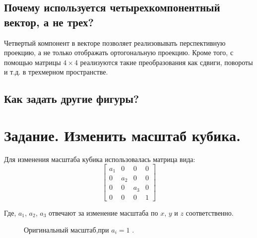\documentclass[a5paper, 10pt]{article}
\theoremstyle{definition}
\theoremstyle{plain}
\theoremstyle{remark}
\begin{document}
\newpage
\subsection{Почему используется четырехкомпонентный вектор, а не трех?}
Четвертый компонент в векторе позволяет реализовывать перспективную проекцию, а не только отображать ортогональную проекцию. Кроме того, с помощью матрицы $4 \times 4$ реализуются такие преобразования как сдвиги, повороты и т.д. в трехмерном пространстве.

\subsection{Как задать другие фигуры?}






\newpage
\section{Задание. Изменить масштаб кубика.}
Для изменения масштаба кубика использовалась матрица вида:
\begin{equation}
\begin{bmatrix}
a_1 & 0 & 0 & 0\\
0 & a_2 & 0 & 0 \\
0 & 0 & a_3 & 0\\
0 & 0 & 0 & 1
\end{bmatrix}
\end{equation}

Где, $a_1$, $a_2$, $a_3$ отвечают за изменение масштаба по $x$, $y$ и $z$ соответственно.
\begin{figure}[h!]
\caption{Оригинальный масштаб,при $a_i = 1$ .}
\end{figure}
\end{document}
